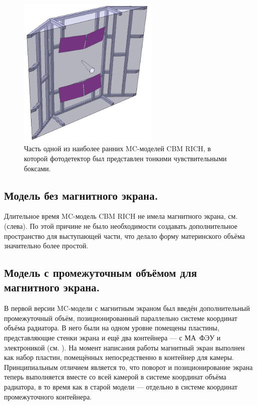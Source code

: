 \begin{figure}[H]
\centering
\includegraphics[width=0.6\textwidth]{pictures/PrimitivePhotodetector.png}
\caption{Часть одной из наиболее ранних MC-моделей CBM RICH, в которой фотодетектор был представлен тонкими чувствительными боксами.}
\label{fig:PrimitivePhotodetector}
\end{figure}

\subsection{Модель без магнитного экрана.}

Длительное время MC-модель CBM RICH не имела магнитного экрана, см. (слева). По этой причине не было необходимости создавать дополнительное пространство для выступающей части, что делало форму материнского объёма значительно более простой.

\subsection{Модель с промежуточным объёмом для магнитного экрана.}

В первой версии MC-модели с магнитным экраном был введён дополнительный промежуточный объём, позиционированный параллельно системе координат объёма радиатора. В него были на одном уровне помещены пластины, представляющие стенки экрана и ещё два контейнера --- с МА~ФЭУ и электроникой (см. ). На момент написания работы магнитный экран выполнен как набор пластин, помещённых непосредственно в контейнер для камеры. Принципиальным отличием является то, что поворот и позиционирование экрана теперь выполняется вместе со всей камерой в системе координат объёма радиатора, в то время как в старой модели --- отдельно в системе координат промежуточного контейнера.

